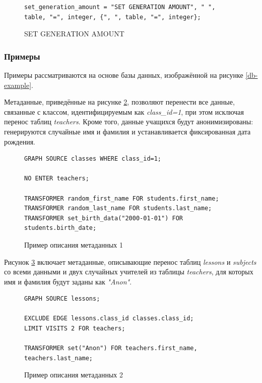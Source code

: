 \begin{figure}
  \begin{lstlisting}
set_generation_amount = "SET GENERATION AMOUNT", " ", table, "=", integer, {", ", table, "=", integer};
  \end{lstlisting}
  \caption{SET GENERATION AMOUNT}
  \label{symbol-set-generation-amount}
\end{figure}

\subsubsection{Примеры}

Примеры рассматриваются на основе базы данных, изображённой на рисунке \ref{db-example}.

Метаданные, приведённые на рисунке \ref{metadata-example-1}, позволяют перенести все данные, связанные с классом, идентифицируемым как \textit{class\_id=1}, при этом исключая перенос таблиц \textit{teachers}. Кроме того, данные учащихся будут анонимизированы: генерируются случайные имя и фамилия и устанавливается фиксированная дата рождения.

\begin{figure}
  \begin{lstlisting}
GRAPH SOURCE classes WHERE class_id=1;

NO ENTER teachers;

TRANSFORMER random_first_name FOR students.first_name;
TRANSFORMER random_last_name FOR students.last_name;
TRANSFORMER set_birth_data("2000-01-01") FOR students.birth_date;
  \end{lstlisting}
  \caption{Пример описания метаданных 1}
  \label{metadata-example-1}
\end{figure}

Рисунок \ref{metadata-example-2} включает метаданные, описывающие перенос таблиц \textit{lessons} и \textit{subjects} со всеми данными и двух случайных учителей из таблицы \textit{teachers}, для которых имя и фамилия будут заданы как \textit{"Anon"}.

\begin{figure}
  \begin{lstlisting}
GRAPH SOURCE lessons;

EXCLUDE EDGE lessons.class_id classes.class_id;
LIMIT VISITS 2 FOR teachers;

TRANSFORMER set("Anon") FOR teachers.first_name, teachers.last_name;
  \end{lstlisting}
  \caption{Пример описания метаданных 2}
  \label{metadata-example-2}
\end{figure}

